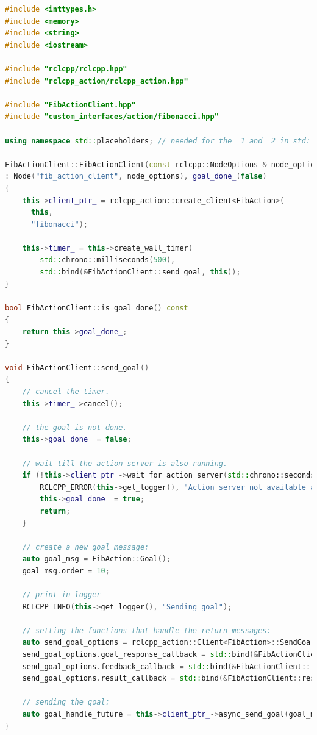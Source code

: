 \begin{lstlisting}[language=C++, caption={ActionClientNode.cpp}, firstnumber=0, label={code:action_client_cpp}]
#include <inttypes.h>
#include <memory>
#include <string>
#include <iostream>

#include "rclcpp/rclcpp.hpp"
#include "rclcpp_action/rclcpp_action.hpp"

#include "FibActionClient.hpp"
#include "custom_interfaces/action/fibonacci.hpp"

using namespace std::placeholders; // needed for the _1 and _2 in std::bind

FibActionClient::FibActionClient(const rclcpp::NodeOptions & node_options)
: Node("fib_action_client", node_options), goal_done_(false)
{
    this->client_ptr_ = rclcpp_action::create_client<FibAction>(
      this,
      "fibonacci");

    this->timer_ = this->create_wall_timer(
        std::chrono::milliseconds(500),
        std::bind(&FibActionClient::send_goal, this));
}

bool FibActionClient::is_goal_done() const
{
    return this->goal_done_;
}

void FibActionClient::send_goal()
{
    // cancel the timer.
    this->timer_->cancel();

    // the goal is not done.
    this->goal_done_ = false;

    // wait till the action server is also running.
    if (!this->client_ptr_->wait_for_action_server(std::chrono::seconds(10))) {
        RCLCPP_ERROR(this->get_logger(), "Action server not available after waiting");
        this->goal_done_ = true;
        return;
    }

    // create a new goal message:
    auto goal_msg = FibAction::Goal();
    goal_msg.order = 10;

    // print in logger
    RCLCPP_INFO(this->get_logger(), "Sending goal");
    
    // setting the functions that handle the return-messages:
    auto send_goal_options = rclcpp_action::Client<FibAction>::SendGoalOptions();
    send_goal_options.goal_response_callback = std::bind(&FibActionClient::goal_response_callback, this, _1);
    send_goal_options.feedback_callback = std::bind(&FibActionClient::feedback_callback, this, _1, _2);
    send_goal_options.result_callback = std::bind(&FibActionClient::result_callback, this, _1);

    // sending the goal:
    auto goal_handle_future = this->client_ptr_->async_send_goal(goal_msg, send_goal_options);
}




\end{lstlisting}
